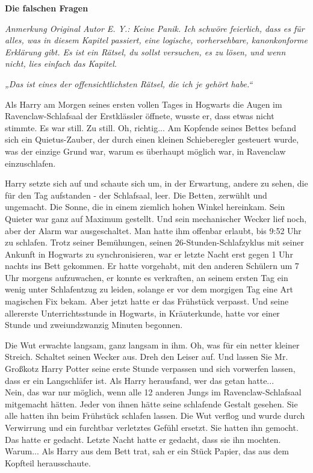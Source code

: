 

\hypertarget{die-falschen-fragen}{%

\textbf{Die falschen Fragen}

\emph{Anmerkung Original Autor E. Y.: Keine Panik. Ich schwöre feierlich, dass es für alles, was in diesem Kapitel passiert, eine logische, vorhersehbare, kanonkonforme Erklärung gibt. Es ist ein Rätsel, du sollst versuchen, es zu lösen, und wenn nicht, lies einfach das Kapitel.}

\emph{„Das ist eines der offensichtlichsten Rätsel, die ich je gehört habe.“}

Als Harry am Morgen seines ersten vollen Tages in Hogwarts die Augen im Ravenclaw-Schlafsaal der Erstklässler öffnete, wusste er, dass etwas nicht stimmte. Es war still. Zu still. Oh, richtig... Am Kopfende seines Bettes befand sich ein Quietus-Zauber, der durch einen kleinen Schieberegler gesteuert wurde, was der einzige Grund war, warum es überhaupt möglich war, in Ravenclaw einzuschlafen.

Harry setzte sich auf und schaute sich um, in der Erwartung, andere zu sehen, die für den Tag aufstanden - der Schlafsaal, leer. Die Betten, zerwühlt und ungemacht. Die Sonne, die in einem ziemlich hohen Winkel hereinkam. Sein Quieter war ganz auf Maximum gestellt. Und sein mechanischer Wecker lief noch, aber der Alarm war ausgeschaltet. Man hatte ihm offenbar erlaubt, bis 9:52 Uhr zu schlafen. Trotz seiner Bemühungen, seinen 26-Stunden-Schlafzyklus mit seiner Ankunft in Hogwarts zu synchronisieren, war er letzte Nacht erst gegen 1 Uhr nachts ins Bett gekommen. Er hatte vorgehabt, mit den anderen Schülern um 7 Uhr morgens aufzuwachen, er konnte es verkraften, an seinem ersten Tag ein wenig unter Schlafentzug zu leiden, solange er vor dem morgigen Tag eine Art magischen Fix bekam. Aber jetzt hatte er das Frühstück verpasst. Und seine allererste Unterrichtsstunde in Hogwarts, in Kräuterkunde, hatte vor einer Stunde und zweiundzwanzig Minuten begonnen.

Die Wut erwachte langsam, ganz langsam in ihm. Oh, was für ein netter kleiner Streich. Schaltet seinen Wecker aus. Dreh den Leiser auf. Und lassen Sie Mr. Großkotz Harry Potter seine erste Stunde verpassen und sich vorwerfen lassen, dass er ein Langschläfer ist. Als Harry herausfand, wer das getan hatte...\\ Nein, das war nur möglich, wenn alle 12 anderen Jungs im Ravenclaw-Schlafsaal mitgemacht hätten. Jeder von ihnen hätte seine schlafende Gestalt gesehen. Sie alle hatten ihn beim Frühstück schlafen lassen. Die Wut verflog und wurde durch Verwirrung und ein furchtbar verletztes Gefühl ersetzt. Sie hatten ihn gemocht. Das hatte er gedacht. Letzte Nacht hatte er gedacht, dass sie ihn mochten. Warum... Als Harry aus dem Bett trat, sah er ein Stück Papier, das aus dem Kopfteil herausschaute.

}
